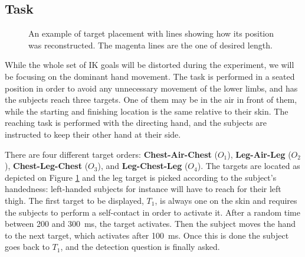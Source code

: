 \subsection{Task}
\label{sec:task}

\begin{figure}
    \caption{An example of target placement with lines showing how its position was reconstructed. The magenta lines are the one of desired length.}\label{fig:targetPlacement}
\end{figure}

While the whole set of IK goals will be distorted during the experiment, we will be focusing on the dominant hand movement. The task is performed in a seated position in order to avoid any unnecessary movement of the lower limbs, and has the subjects reach three targets. One of them may be in the air in front of them, while the starting and finishing location is the same relative to their skin. The reaching task is performed with the directing hand, and the subjects are instructed to keep their other hand at their side.

There are four different target orders: \textbf{Chest-Air-Chest} ($O_1$), \textbf{Leg-Air-Leg} ($O_2$), \textbf{Chest-Leg-Chest} ($O_3$), and \textbf{Leg-Chest-Leg} ($O_4$). The targets are located as depicted on Figure \ref{fig:targetPlacement} and the leg target is picked according to the subject's handedness: left-handed subjects for instance will have to reach for their left thigh. The first target to be displayed, $T_1$, is always one on the skin and requires the subjects to perform a self-contact in order to activate it. After a random time between \num{200} and \SI{300}{\milli\second}, the target activates. Then the subject moves the hand to the next target, which activates after \SI{100}{\milli\second}. Once this is done the subject goes back to $T_1$, and the detection question is finally asked.

